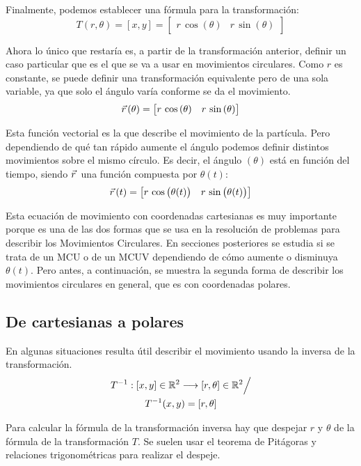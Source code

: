 Finalmente, podemos establecer una fórmula para la transformación:
\[
  T(r, \theta) = [x,y] =
  \begin{bmatrix}
      r \, \cos{(\theta)} & r \, \sin{(\theta)}
  \end{bmatrix}
\]

Ahora lo único que restaría es, a partir de la transformación anterior, definir un caso particular que es el que se va a usar en movimientos circulares.
Como $r$ es constante, se puede definir una transformación equivalente pero de una sola variable, ya que solo el ángulo varía conforme se da el movimiento.
\[ \vec{r}\hspace{0.05cm}(\theta) = \begin{bmatrix} r \, \cos{(\theta)} & r \, \sin{(\theta)} \end{bmatrix} \]

Esta función vectorial es la que describe el movimiento de la partícula.
Pero dependiendo de qué tan rápido aumente el ángulo podemos definir distintos movimientos sobre el mismo círculo.
Es decir, el ángulo $(\theta)$ está en función del tiempo, siendo $\vec{r}\hspace{0.05cm}$ una función compuesta por $\theta (t)$:
\[
  \vec{r}\hspace{0.05cm}(t) =
    \begin{bmatrix}
        r \, \cos{\big( \theta (t) \big)} & r \, \sin{\big( \theta (t) \big)}
    \end{bmatrix}
\]

Esta ecuación de movimiento con coordenadas cartesianas es muy importante porque es una de las dos formas que se usa en la resolución de problemas para describir los Movimientos Circulares.
En secciones posteriores se estudia si se trata de un MCU o de un MCUV dependiendo de cómo aumente o disminuya $\theta(t)$.
Pero antes, a continuación, se muestra la segunda forma de describir los movimientos circulares en general, que es con coordenadas polares.

\subsection{De cartesianas a polares}

En algunas situaciones resulta útil describir el movimiento usando la inversa de la transformación.
\begin{multline*}
  T^{-1}:[x,y] \in \mathbb{R}^2 \longrightarrow [r,\theta] \in \mathbb{R}^2 \Big/ \\
  T^{-1} (x,y) = [r,\theta]
\end{multline*}

Para calcular la fórmula de la transformación inversa hay que despejar $r$ y $\theta$ de la fórmula de la transformación $T$.
Se suelen usar el teorema de Pitágoras y relaciones trigonométricas para realizar el despeje.

